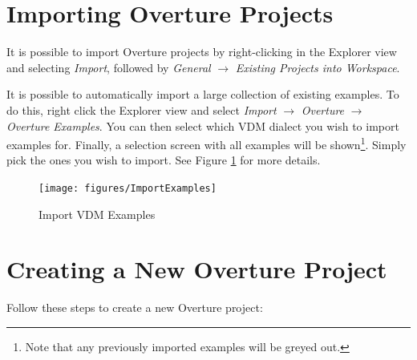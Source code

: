 \documentclass{overturerepchap}
\begin{document}
\section{Importing Overture Projects}\label{subsec:importproj}

It is possible to import Overture projects by
right-clicking in the Explorer view and selecting \emph{Import}, followed
by \emph{General} $\rightarrow$ \emph{Existing Projects into
  Workspace}.  


It is possible to automatically import a large collection of existing examples. 
To do this, right click the Explorer view and select
\emph{Import} $\rightarrow$ \emph{Overture} $\rightarrow$ \emph{Overture
Examples}.  You can then select which VDM dialect you wish to import examples
for. Finally, a selection screen with all examples will be shown\footnote{Note
that any previously imported examples will be greyed out.}. Simply pick the ones
you wish to import. See Figure \ref{fig:example_import} for more
details.


\begin{figure}[!htb]
	\begin{center}
	  \texttt{[image: figures/ImportExamples]}
	  \caption[Import existing VDM Examples]{Import VDM Examples}
	  \label{fig:example_import}
	\end{center}
\end{figure}


\section{Creating a New Overture Project}

Follow these steps to create a new Overture project:
\end{document}
